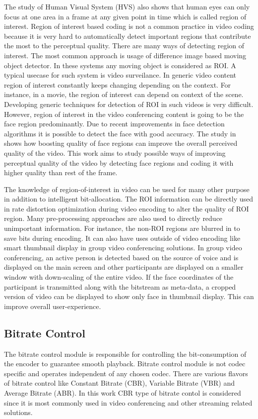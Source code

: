\documentclass[11pt]{article} %
\begin{document}
The study of Human Visual System (HVS) also shows that human eyes can only focus at one area in a frame at any given point in time which is called region of interest. Region of interest based coding is not a common practice in video coding because it is very hard to automatically detect important regions that contribute the most to the perceptual quality. There are many ways of detecting region of interest. The most common approach is usage of difference image based moving object detector. In these systems any moving object is considered as ROI. A typical usecase for such system is video surveilance. In generic video content region of interest constantly keeps changing depending on the context. For instance, in a movie, the region of interest can depend on context of the scene. Developing generic techniques for detection of ROI in such videos is very difficult. However, region of interest in the video conferencing content is going to be the face region predominantly. Due to recent improvements in face detection algorithms it is possible to detect the face with good accuracy. The study in \cite{HighQualityROICodingForVideoConferencing} shows how boosting quality of face regions can improve the overall perceived quality of the video. This work aims to study possible ways of improving perceptual quality of the video by detecting face regions and coding it with higher quality than rest of the frame.

The knowledge of region-of-interest in video can be used for many other purpose in addition to intelligent bit-allocation. The ROI information can be directly used in rate distortion optimization during video encoding to alter the quality of ROI region. Many pre-processing approaches are also used to directly reduce unimportant information. For instance, the non-ROI regions are blurred in \cite{ROI-background-blurring} to save bits during encoding. It can also have uses outside of video encoding like smart thumbnail display in group video conferencing solutions. In group video conferencing, an active person is detected based on the source of voice and is displayed on the main screen and other participants are displayed on a smaller window with down-scaling of the entire video. If the face coordinates of the participant is transmitted along with the bitstream as meta-data, a cropped version of video can be displayed to show only face in thumbnail display. This can improve overall user-experience.

\subsection{Bitrate Control}
	The bitrate control module is responsible for controlling the bit-consumption of the encoder to guarantee smooth playback. Bitrate control module is not codec specific and operates independent of any chosen codec. There are various flavors of bitrate control like Constant Bitrate (CBR), Variable Bitrate (VBR) and Average Bitrate (ABR). In this work CBR type of bitrate contol is considered since it is most commonly used in video conferencing and other streaming related solutions. 
	
\end{document}
